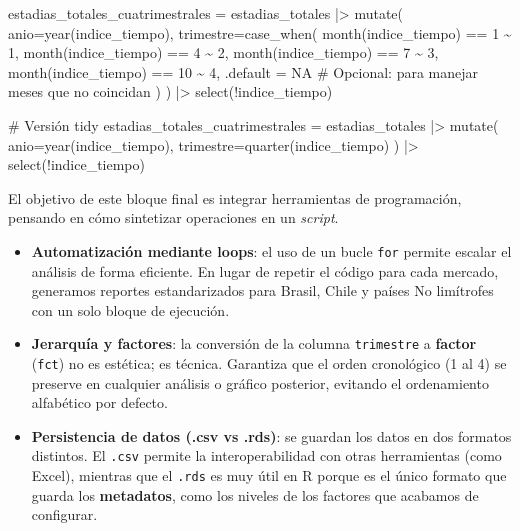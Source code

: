 \documentclass[
  spanish,
  letterpaper,
  DIV=11,
  numbers=noendperiod]{scrartcl}
\newenvironment{Shaded}{\begin{snugshade}}{\end{snugshade}}
\newcommand{\AttributeTok}[1]{\textcolor[rgb]{0.40,0.45,0.13}{#1}}
\newcommand{\CommentTok}[1]{\textcolor[rgb]{0.37,0.37,0.37}{#1}}
\newcommand{\ConstantTok}[1]{\textcolor[rgb]{0.56,0.35,0.01}{#1}}
\newcommand{\DecValTok}[1]{\textcolor[rgb]{0.68,0.00,0.00}{#1}}
\newcommand{\FunctionTok}[1]{\textcolor[rgb]{0.28,0.35,0.67}{#1}}
\newcommand{\NormalTok}[1]{\textcolor[rgb]{0.00,0.23,0.31}{#1}}
\newcommand{\OtherTok}[1]{\textcolor[rgb]{0.00,0.23,0.31}{#1}}
\newcommand{\SpecialCharTok}[1]{\textcolor[rgb]{0.37,0.37,0.37}{#1}}
\begin{document}
\begin{Shaded}
\begin{Highlighting}[]
\NormalTok{estadias\_totales\_cuatrimestrales }\OtherTok{=}\NormalTok{ estadias\_totales }\SpecialCharTok{|\textgreater{}} 
  \FunctionTok{mutate}\NormalTok{(}
    \AttributeTok{anio=}\FunctionTok{year}\NormalTok{(indice\_tiempo),}
    \AttributeTok{trimestre=}\FunctionTok{case\_when}\NormalTok{(}
      \FunctionTok{month}\NormalTok{(indice\_tiempo) }\SpecialCharTok{==} \DecValTok{1}  \SpecialCharTok{\textasciitilde{}} \DecValTok{1}\NormalTok{,}
      \FunctionTok{month}\NormalTok{(indice\_tiempo) }\SpecialCharTok{==} \DecValTok{4}  \SpecialCharTok{\textasciitilde{}} \DecValTok{2}\NormalTok{,}
      \FunctionTok{month}\NormalTok{(indice\_tiempo) }\SpecialCharTok{==} \DecValTok{7}  \SpecialCharTok{\textasciitilde{}} \DecValTok{3}\NormalTok{,}
      \FunctionTok{month}\NormalTok{(indice\_tiempo) }\SpecialCharTok{==} \DecValTok{10} \SpecialCharTok{\textasciitilde{}} \DecValTok{4}\NormalTok{,}
      \AttributeTok{.default =} \ConstantTok{NA} \CommentTok{\# Opcional: para manejar meses que no coincidan}
\NormalTok{    )}
\NormalTok{  ) }\SpecialCharTok{|\textgreater{}} \FunctionTok{select}\NormalTok{(}\SpecialCharTok{!}\NormalTok{indice\_tiempo)}

\CommentTok{\# Versión tidy}
\NormalTok{estadias\_totales\_cuatrimestrales }\OtherTok{=}\NormalTok{ estadias\_totales }\SpecialCharTok{|\textgreater{}} 
  \FunctionTok{mutate}\NormalTok{(}
    \AttributeTok{anio=}\FunctionTok{year}\NormalTok{(indice\_tiempo),}
    \AttributeTok{trimestre=}\FunctionTok{quarter}\NormalTok{(indice\_tiempo)}
\NormalTok{  ) }\SpecialCharTok{|\textgreater{}} \FunctionTok{select}\NormalTok{(}\SpecialCharTok{!}\NormalTok{indice\_tiempo)}
\end{Highlighting}
\end{Shaded}

El objetivo de este bloque final es integrar herramientas de
programación, pensando en cómo sintetizar operaciones en un
\emph{script}.

\begin{itemize}
\item
  \textbf{Automatización mediante loops}: el uso de un bucle
  \texttt{for} permite escalar el análisis de forma eficiente. En lugar
  de repetir el código para cada mercado, generamos reportes
  estandarizados para Brasil, Chile y países No limítrofes con un solo
  bloque de ejecución.
\item
  \textbf{Jerarquía y factores}: la conversión de la columna
  \texttt{trimestre} a \textbf{factor} (\texttt{fct}) no es estética; es
  técnica. Garantiza que el orden cronológico (1 al 4) se preserve en
  cualquier análisis o gráfico posterior, evitando el ordenamiento
  alfabético por defecto.
\item
  \textbf{Persistencia de datos (.csv vs .rds)}: se guardan los datos en
  dos formatos distintos. El \texttt{.csv} permite la interoperabilidad
  con otras herramientas (como Excel), mientras que el \texttt{.rds} es
  muy útil en R porque es el único formato que guarda los
  \textbf{metadatos}, como los niveles de los factores que acabamos de
  configurar.
\end{itemize}
\end{document}
